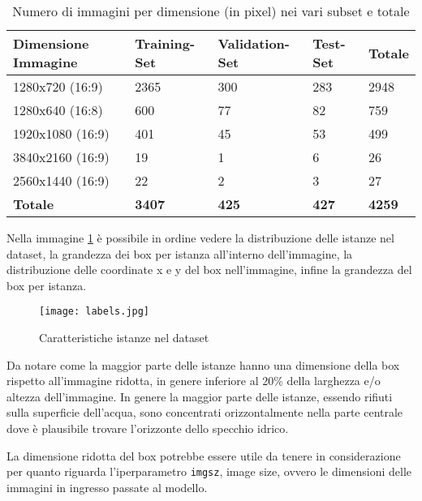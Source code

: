 \begin{table}[htbp]
    \centering
    \begin{tabularx}{\textwidth}{lYYYY}
        \toprule
        \textbf{Dimensione Immagine} & \textbf{Training-Set} & \textbf{Validation-Set} & \textbf{Test-Set} & \textbf{Totale} \\
        \midrule
        1280x720   (16:9) & 2365 & 300 & 283 & 2948 \\
        1280x640   (16:8)& 600 & 77 & 82 & 759 \\
        1920x1080  (16:9) & 401 & 45 & 53 & 499 \\
        3840x2160   (16:9) & 19 & 1 & 6 & 26 \\
        2560x1440  (16:9) & 22 & 2 & 3 & 27 \\
        \midrule
        \textbf{Totale} & \textbf{3407} & \textbf{425} & \textbf{427} & \textbf{4259} \\
        \bottomrule
    \end{tabularx}
    \caption{Numero di immagini per dimensione (in pixel) nei vari subset e totale}
    \label{table:3}
\end{table}

Nella immagine \ref{fig:1} è possibile in ordine vedere la distribuzione delle istanze nel dataset, la grandezza dei box per istanza all'interno dell'immagine, la distribuzione delle coordinate x e y del box nell'immagine, infine la grandezza del box per istanza.

\begin{figure}[!bth]
    \centering
    \texttt{[image: labels.jpg]}
    \caption{Caratteristiche istanze nel dataset}
    \label{fig:1}
    \end{figure}

Da notare come la maggior parte delle istanze hanno una dimensione della box rispetto all'immagine ridotta, in genere inferiore al 20\% della larghezza e/o altezza dell'immagine. In genere la maggior parte delle istanze, essendo rifiuti sulla superficie dell'acqua, sono concentrati orizzontalmente nella parte centrale dove è plausibile trovare l'orizzonte dello specchio idrico.

La dimensione ridotta del box potrebbe essere utile da tenere in considerazione per quanto riguarda l'iperparametro \verb+imgsz+, image size, ovvero le dimensioni delle immagini in ingresso passate al modello.